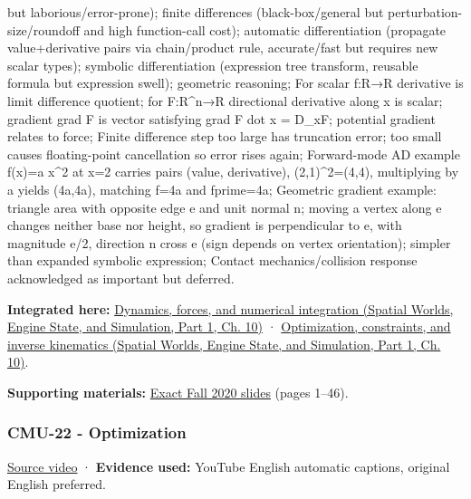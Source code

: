 but laborious/error-prone); finite differences (black-box/general but perturbation-size/roundoff and high function-call cost); automatic differentiation (propagate value+derivative pairs via chain/product rule, accurate/fast but requires new scalar types); symbolic differentiation (expression tree transform, reusable formula but expression swell); geometric reasoning; For scalar f:R→R derivative is limit difference quotient; for F:R\^{}n→R directional derivative along x is scalar; gradient grad F is vector satisfying grad F dot x = D\_xF; potential gradient relates to force; Finite difference step too large has truncation error; too small causes floating-point cancellation so error rises again; Forward-mode AD example f(x)=a x\^{}2 at x=2 carries pairs (value, derivative), (2,1)\^{}2=(4,4), multiplying by a yields (4a,4a), matching f=4a and fprime=4a; Geometric gradient example: triangle area with opposite edge e and unit normal n; moving a vertex along e changes neither base nor height, so gradient is perpendicular to e, with magnitude \textbar e\textbar/2, direction n cross e (sign depends on vertex orientation); simpler than expanded symbolic expression; Contact mechanics/collision response acknowledged as important but deferred.

\textbf{Integrated here:} \href{../05-Spatial-Worlds-Engine-State-and-Simulation-P01/main.pdf\#04-visual-computing-ii-ch029-dynamics-forces-and-numerical-integration}{Dynamics, forces, and numerical integration (Spatial Worlds, Engine State, and Simulation, Part 1, Ch. 10)} · \href{../05-Spatial-Worlds-Engine-State-and-Simulation-P01/main.pdf\#04-visual-computing-ii-ch029-optimization-constraints-and-inverse-kinematics}{Optimization, constraints, and inverse kinematics (Spatial Worlds, Engine State, and Simulation, Part 1, Ch. 10)}.

\textbf{Supporting materials:} \href{https://15462.courses.cs.cmu.edu/fall2020content/lectures/21_dynamicstimeintegration/21_dynamicstimeintegration_slides.pdf}{Exact Fall 2020 slides} (pages 1--46).

\subsubsection{CMU-22 - Optimization}\label{04-visual-computing-ii-ch036-cmu-22---optimization}

\hypertarget{04-visual-computing-ii-ch036-cmu-22---optimization}{}

\href{https://www.youtube.com/watch?v=sDAEFFoiKZ0}{Source video} · \textbf{Evidence used:} YouTube English automatic captions, original English preferred.

